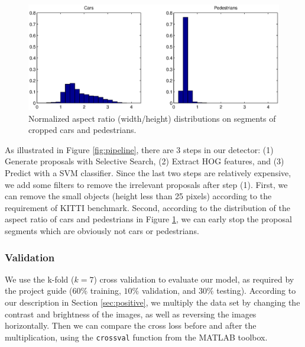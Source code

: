 \documentclass{article} %
\begin{document}
\begin{figure}[htb]
\begin{center}
\includegraphics[width=\textwidth]{aspect_ratio.eps}
\end{center}
\caption{Normalized aspect ratio (width/height) distributions on segments of cropped cars and pedestrians.
\label{fig:aspect_ratio}}
\end{figure}

As illustrated in Figure \ref{fig:pipeline}, there are 3 steps in our detector: (1) Generate proposals with Selective Search, (2) Extract HOG features, and (3) Predict with a SVM classifier. Since the last two steps are relatively expensive, we add some filters to remove the irrelevant proposals after step (1). First, we can remove the small objects (height less than 25 pixels) according to the requirement of KITTI benchmark. Second, according to the distribution of the aspect ratio of cars and pedestrians in Figure \ref{fig:aspect_ratio}, we can early stop the proposal segments which are obviously not cars or pedestrians.

\subsubsection{Validation}

We use the k-fold ($k=7$) cross validation to evaluate our model, as required by the project guide ($60\%$ training, $10\%$ validation, and $30\%$ testing). According to our description in Section \ref{sec:positive}, we multiply the data set by changing the contrast and brightness of the images, as well as reversing the images horizontally. Then we can compare the cross loss before and after the multiplication, using the \texttt{crossval} function from the MATLAB toolbox.
\end{document}
